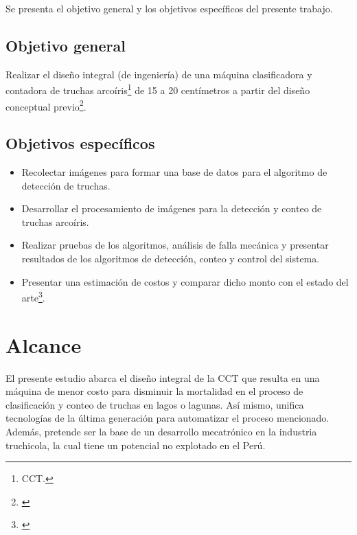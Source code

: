Se presenta el objetivo general y los objetivos específicos del presente trabajo.

\subsection{Objetivo general}

Realizar el diseño integral (de ingeniería) de una máquina clasificadora y contadora de truchas arcoíris\footnote{CCT.} de 15 a 20 centímetros a partir del diseño conceptual previo\footnote{\cite{DiazVergara2020}}.

\subsection{Objetivos específicos}

\begin{itemize}
	\item Recolectar imágenes para formar una base de datos para el algoritmo de detección de truchas. 
	\item Desarrollar el procesamiento de imágenes para la detección y conteo de truchas arcoíris.
	\item Realizar pruebas de los algoritmos, análisis de falla mecánica y presentar resultados de los algoritmos de detección, conteo y control del sistema.
	\item Presentar una estimación de costos y comparar dicho monto con el estado del arte\footnote{\cite{DiazVergara2020}}.	
\end{itemize}


\section{Alcance}

El presente estudio abarca el diseño integral de la CCT que resulta en una máquina de menor costo para disminuir la mortalidad en el proceso de clasificación y conteo de truchas en lagos o lagunas. Así mismo, unifica tecnologías de la última generación para automatizar el proceso mencionado. Además, pretende ser la base de un desarrollo mecatrónico en la industria truchicola, la cual tiene un potencial no explotado en el Perú.











